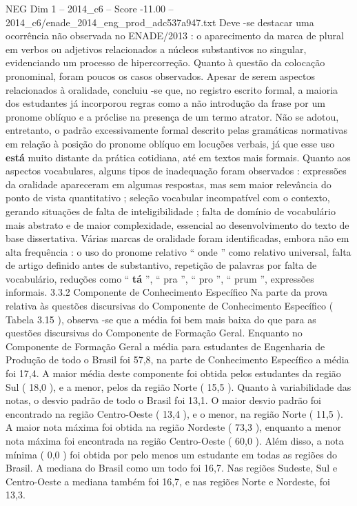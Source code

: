 \begin{textsample}{NEG Dim 1 – 2014\_c6 – Score -11.00 – 2014\_c6/enade\_2014\_eng\_prod\_adc537a947.txt}
Deve -se destacar uma ocorrência não observada no ENADE/2013 : o aparecimento da marca de plural em verbos ou adjetivos relacionados a núcleos substantivos no singular, evidenciando um processo de hipercorreção.
Quanto à questão da colocação pronominal, foram poucos os casos observados.
Apesar de serem aspectos relacionados à oralidade, concluiu -se que, no registro escrito formal, a maioria dos estudantes já incorporou regras como a não introdução da frase por um pronome oblíquo e a próclise na presença de um termo atrator.
Não se adotou, entretanto, o padrão excessivamente formal descrito pelas gramáticas normativas em relação à posição do pronome oblíquo em locuções verbais, já que esse uso \textbf{está} muito distante da prática cotidiana, até em textos mais formais.
Quanto aos aspectos vocabulares, alguns tipos de inadequação foram observados : expressões da oralidade apareceram em algumas respostas, mas sem maior relevância do ponto de vista quantitativo ; seleção vocabular incompatível com o contexto, gerando situações de falta de inteligibilidade ; falta de domínio de vocabulário mais abstrato e de maior complexidade, essencial ao desenvolvimento do texto de base dissertativa.
Várias marcas de oralidade foram identificadas, embora não em alta frequência : o uso do pronome relativo “ onde ” como relativo universal, falta de artigo definido antes de substantivo, repetição de palavras por falta de vocabulário, reduções como “ \textbf{tá} ”, “ pra ”, “ pro ”, “ prum ”, expressões informais. 3.3.2 Componente de Conhecimento Específico Na parte da prova relativa às questões discursivas do Componente de Conhecimento Específico ( Tabela 3.15 ), observa -se que a média foi bem mais baixa do que para as questões discursivas do Componente de Formação Geral.
Enquanto no Componente de Formação Geral a média para estudantes de Engenharia de Produção de todo o Brasil foi 57,8, na parte de Conhecimento Específico a média foi 17,4.
A maior média deste componente foi obtida pelos estudantes da região Sul ( 18,0 ), e a menor, pelos da região Norte ( 15,5 ).
Quanto à variabilidade das notas, o desvio padrão de todo o Brasil foi 13,1.
O maior desvio padrão foi encontrado na região Centro-Oeste ( 13,4 ), e o menor, na região Norte ( 11,5 ).
A maior nota máxima foi obtida na região Nordeste ( 73,3 ), enquanto a menor nota máxima foi encontrada na região Centro-Oeste ( 60,0 ).
Além disso, a nota mínima ( 0,0 ) foi obtida por pelo menos um estudante em todas as regiões do Brasil.
A mediana do Brasil como um todo foi 16,7.
Nas regiões Sudeste, Sul e Centro-Oeste a mediana também foi 16,7, e nas regiões Norte e Nordeste, foi 13,3.

\end{textsample}
